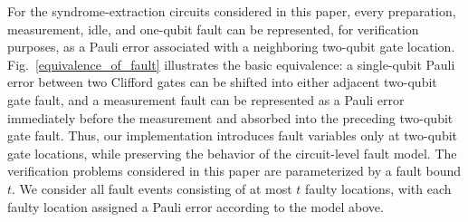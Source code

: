 \documentclass[acmsmall,screen,review,anonymous,nonacm]{acmart}
\newcommand{\yfc}[1]{}
\newcommand{\cy}[1]{}
\begin{document}
For the syndrome-extraction circuits considered in this paper, every preparation, measurement, idle, and one-qubit fault can be represented, for verification purposes, as a Pauli error associated with a neighboring two-qubit gate location. Fig.~\ref{equivalence_of_fault} illustrates the basic equivalence: a single-qubit Pauli error between two Clifford gates can be shifted into either adjacent two-qubit gate fault, and a measurement fault can be represented as a Pauli error immediately before the measurement and absorbed into the preceding two-qubit gate fault. Thus, our implementation introduces fault variables only at two-qubit gate locations, while preserving the behavior of the circuit-level fault model.
The verification problems considered in this paper are parameterized by a fault bound $t$. We consider all fault events consisting of at most $t$ faulty locations, with each faulty location assigned a Pauli error according to the model above.







\end{document}
